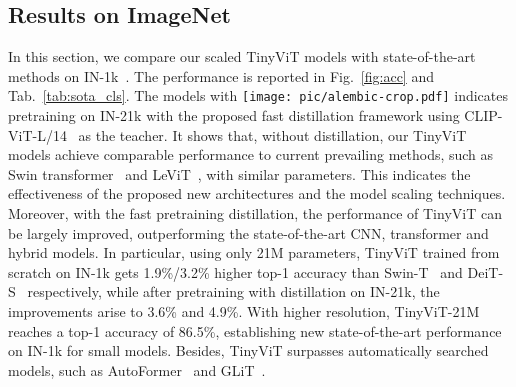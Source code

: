 \documentclass[runningheads]{llncs}
\def \alambic {\texttt{[image: pic/alembic-crop.pdf]}\xspace}
\begin{document}
\subsection{Results on ImageNet}
In this section, we compare our scaled TinyViT models with state-of-the-art methods on IN-1k~\cite{imagenet}. 
The performance is reported in Fig.~\ref{fig:acc} and Tab.~\ref{tab:sota_cls}.
The models with \alambic indicates pretraining on IN-21k with the proposed fast distillation framework
using CLIP-ViT-L/14~\cite{clip,ViT} as the teacher. It shows that, without distillation, our TinyViT models achieve comparable performance to current prevailing methods, such as Swin transformer~\cite{swin} and LeViT~\cite{levit}, with similar parameters. This indicates the effectiveness of the proposed new architectures and the model scaling techniques. Moreover, with the fast pretraining distillation, the performance of TinyViT can be largely improved, outperforming the state-of-the-art CNN, transformer and hybrid models. In particular, using only 21M parameters, TinyViT trained from scratch on IN-1k gets 1.9\%/3.2\% higher top-1 accuracy than Swin-T~\cite{swin} and DeiT-S~\cite{deit} respectively, while after pretraining with distillation on IN-21k, the improvements arise to 3.6\% and 4.9\%. With higher resolution, TinyViT-21M reaches a top-1 accuracy of 86.5\%, establishing new state-of-the-art performance on IN-1k for small models. Besides, TinyViT surpasses automatically searched models, such as AutoFormer~\cite{autoformer} and GLiT~\cite{glit}.
\end{document}
